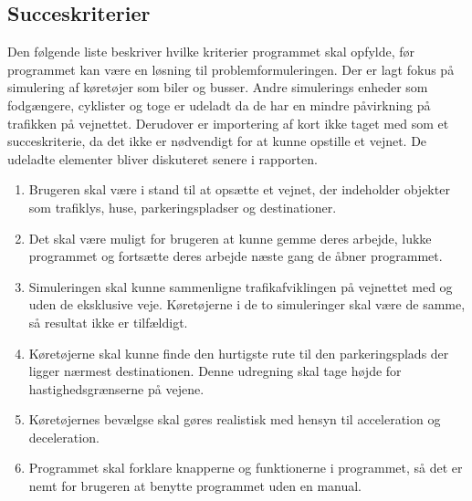 \vspace{5mm}

\subsection*{Succeskriterier}\label{Succeskriterier}
Den følgende liste beskriver hvilke kriterier programmet skal opfylde, før programmet kan være en løsning til problemformuleringen. Der er lagt fokus på simulering af køretøjer som biler og busser. Andre simulerings enheder som fodgængere, cyklister og toge er udeladt da de har en mindre påvirkning på trafikken på vejnettet. Derudover er importering af kort ikke taget med som et succeskriterie, da det ikke er nødvendigt for at kunne opstille et vejnet. De udeladte elementer bliver diskuteret senere i rapporten.

\begin{enumerate}
\item Brugeren skal være i stand til at opsætte et vejnet, der indeholder objekter som trafiklys, huse, parkeringspladser og destinationer.
\item Det skal være muligt for brugeren at kunne gemme deres arbejde, lukke programmet og fortsætte deres arbejde næste gang de åbner programmet.
\item Simuleringen skal kunne sammenligne trafikafviklingen på vejnettet med og uden de eksklusive veje. Køretøjerne i de to simuleringer skal være de samme, så resultat ikke er tilfældigt.
\item Køretøjerne skal kunne finde den hurtigste rute til den parkeringsplads der ligger nærmest destinationen. Denne udregning skal tage højde for hastighedsgrænserne på vejene.
\item Køretøjernes bevælgse skal gøres realistisk med hensyn til acceleration og deceleration.
\item Programmet skal forklare knapperne og funktionerne i programmet, så det er nemt for brugeren at benytte programmet uden en manual.
\end{enumerate}
